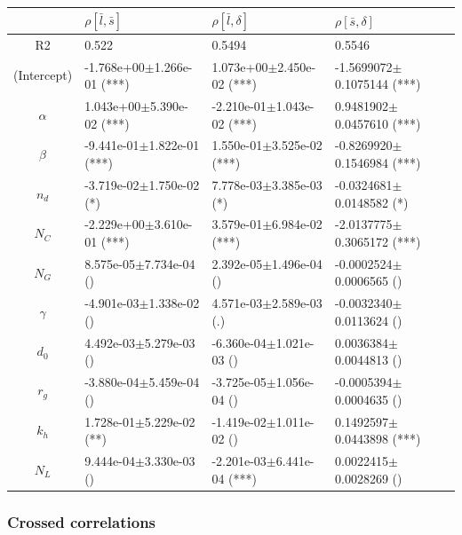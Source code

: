 \begin{center}
\begin{tabular}{|c|p{3.7cm}|p{3.7cm}|p{3.7cm}|}
 \hline
&$\rho [\bar{l},\bar{s}]$&$\rho [\bar{l},\delta]$&$\rho [\bar{s},\delta]$\\\hline
R2&0.522&0.5494&0.5546\\\hline
(Intercept)&-1.768e+00$\pm$1.266e-01 (***)&1.073e+00$\pm$2.450e-02 (***)&-1.5699072$\pm$0.1075144 (***)\\
$\alpha$&1.043e+00$\pm$5.390e-02 (***)&-2.210e-01$\pm$1.043e-02 (***)&0.9481902$\pm$0.0457610 (***)\\
$\beta$&-9.441e-01$\pm$1.822e-01 (***)&1.550e-01$\pm$3.525e-02 (***)&-0.8269920$\pm$0.1546984 (***)\\
$n_d$&-3.719e-02$\pm$1.750e-02 (*)&7.778e-03$\pm$3.385e-03 (*)&-0.0324681$\pm$0.0148582 (*)\\
$N_C$&-2.229e+00$\pm$3.610e-01 (***)&3.579e-01$\pm$6.984e-02 (***)&-2.0137775$\pm$0.3065172 (***)\\
$N_G$&8.575e-05$\pm$7.734e-04 ()&2.392e-05$\pm$1.496e-04 ()&-0.0002524$\pm$0.0006565 ()\\
$\gamma$&-4.901e-03$\pm$1.338e-02 ()&4.571e-03$\pm$2.589e-03 (.)&-0.0032340$\pm$0.0113624 ()\\
$d_0$&4.492e-03$\pm$5.279e-03 ()&-6.360e-04$\pm$1.021e-03 ()&0.0036384$\pm$0.0044813 ()\\
$r_g$&-3.880e-04$\pm$5.459e-04 ()&-3.725e-05$\pm$1.056e-04 ()&-0.0005394$\pm$0.0004635 ()\\
$k_h$&1.728e-01$\pm$5.229e-02 (**)&-1.419e-02$\pm$1.011e-02 ()&0.1492597$\pm$0.0443898 (***)\\
$N_L$&9.444e-04$\pm$3.330e-03 ()&-2.201e-03$\pm$6.441e-04 (***)&0.0022415$\pm$0.0028269 ()\\
 \hline
\end{tabular}


\end{center}



\subsubsection*{Crossed correlations}


